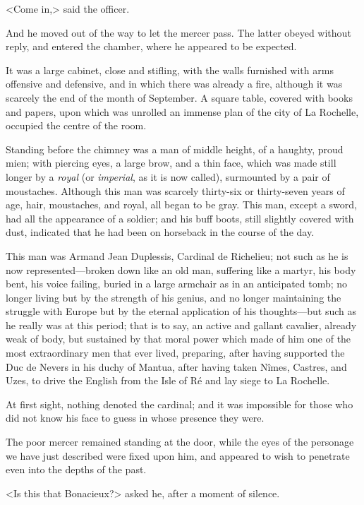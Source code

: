<Come in,> said the officer. 

And he moved out of the way to let the mercer pass. The latter obeyed without reply, and entered the chamber, where he appeared to be expected. 

It was a large cabinet, close and stifling, with the walls furnished with arms offensive and defensive, and in which there was already a fire, although it was scarcely the end of the month of September. A square table, covered with books and papers, upon which was unrolled an immense plan of the city of La Rochelle, occupied the centre of the room. 

Standing before the chimney was a man of middle height, of a haughty, proud mien; with piercing eyes, a large brow, and a thin face, which was made still longer by a \textit{royal} (or \textit{imperial}, as it is now called), surmounted by a pair of moustaches. Although this man was scarcely thirty-six or thirty-seven years of age, hair, moustaches, and royal, all began to be gray. This man, except a sword, had all the appearance of a soldier; and his buff boots, still slightly covered with dust, indicated that he had been on horseback in the course of the day. 

This man was Armand Jean Duplessis, Cardinal de Richelieu; not such as he is now represented—broken down like an old man, suffering like a martyr, his body bent, his voice failing, buried in a large armchair as in an anticipated tomb; no longer living but by the strength of his genius, and no longer maintaining the struggle with Europe but by the eternal application of his thoughts—but such as he really was at this period; that is to say, an active and gallant cavalier, already weak of body, but sustained by that moral power which made of him one of the most extraordinary men that ever lived, preparing, after having supported the Duc de Nevers in his duchy of Mantua, after having taken Nîmes, Castres, and Uzes, to drive the English from the Isle of Ré and lay siege to La Rochelle. 

At first sight, nothing denoted the cardinal; and it was impossible for those who did not know his face to guess in whose presence they were. 

The poor mercer remained standing at the door, while the eyes of the personage we have just described were fixed upon him, and appeared to wish to penetrate even into the depths of the past. 

<Is this that Bonacieux?> asked he, after a moment of silence. 

